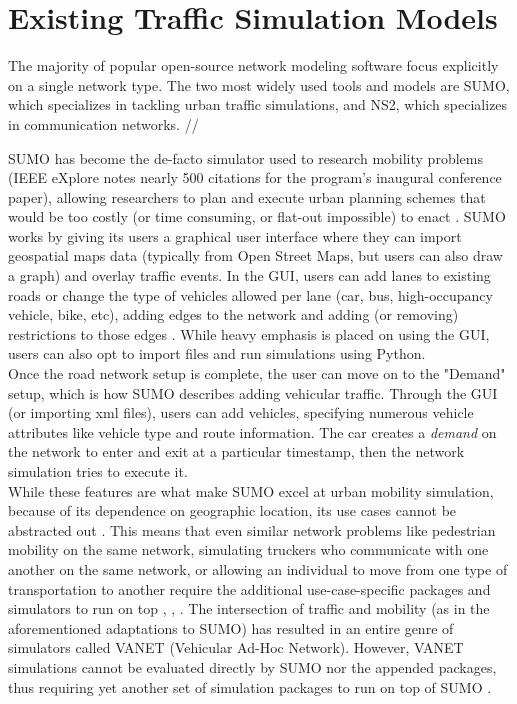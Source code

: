 \chapter{Existing Traffic Simulation Models}
\label{Related}

\par The majority of popular open-source network modeling software focus explicitly on a single network type.  The two most widely used tools and models are SUMO, which specializes in tackling urban traffic simulations, and NS2, which specializes in communication networks. //

SUMO has become the de-facto simulator used to research mobility problems (IEEE eXplore notes nearly 500 citations for the program's inaugural conference paper), allowing researchers to plan and execute urban planning schemes that would be too costly (or time consuming, or flat-out impossible) to enact \cite{LWB18}.  SUMO works by giving its users a graphical user interface where they can import geospatial maps data (typically from Open Street Maps, but users can also draw a graph) and overlay traffic events.  In the GUI, users can add lanes to existing roads or change the type of vehicles allowed per lane (car, bus, high-occupancy vehicle, bike, etc), adding edges to the network and adding (or removing) restrictions to those edges \cite{SUMO2022}. While heavy emphasis is placed on using the GUI, users can also opt to import files and run simulations using Python.\\

Once the road network setup is complete, the user can move on to the "Demand" setup, which is how SUMO describes adding vehicular traffic.  Through the GUI (or importing xml files), users can add vehicles, specifying numerous vehicle attributes like vehicle type and route information\cite{SUMO2022}.  The car creates a \textit{demand} on the network to enter and exit at a particular timestamp, then the network simulation tries to execute it. \\ 

While these features are what make SUMO excel at urban mobility simulation, because of its dependence on geographic location, its use cases cannot be abstracted out \cite{LWB18}. This means that even similar network problems like pedestrian mobility on the same network, simulating truckers who communicate with one another on the same network, or allowing an individual to move from one type of transportation to another require the additional use-case-specific packages and simulators to run on top \cite{NAHRI2021469}, \cite{LWB18}, \cite{SKMR14}. The intersection of traffic and mobility (as in the aforementioned adaptations to SUMO) has resulted in an entire genre of simulators called VANET (Vehicular Ad-Hoc Network).  However, VANET simulations cannot be evaluated directly by SUMO nor the appended packages, thus requiring yet another set of simulation packages to run on top of SUMO \cite{LC08}.\\ 

